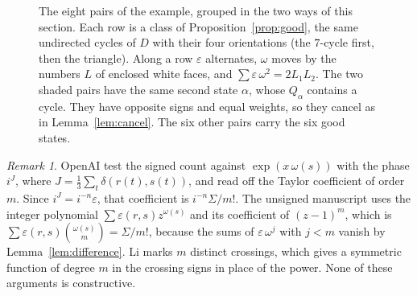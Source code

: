 \documentclass[10pt]{amsart}
\numberwithin{equation}{section}
\theoremstyle{definition}
\theoremstyle{remark}
\newtheorem{remark}[equation]{Remark}
\newcommand{\eps}{\varepsilon}
\begin{document}
\begin{figure}[!htb]
\centering
{}
\caption{The eight pairs of the example, grouped in the two ways of this section. Each row is a class of Proposition~\ref{prop:good}, the same undirected cycles of $D$ with their four orientations (the $7$-cycle first, then the triangle). Along a row $\eps$ alternates, $\omega$ moves by the numbers $L$ of enclosed white faces, and $\sum\eps\,\omega^2=2L_1L_2$. The two shaded pairs have the same second state $\alpha$, whose $Q_\alpha$ contains a cycle. They have opposite signs and equal weights, so they cancel as in Lemma~\ref{lem:cancel}. The six other pairs carry the six good states.}
\label{fig:groupings}
\end{figure}

\begin{remark}\label{rem:other-sums}
OpenAI test the signed count against $\exp(x\,\omega(s))$ with the phase $i^{J}$, where $J=\frac13\sum_t\delta(r(t),s(t))$, and read off the Taylor coefficient of order $m$.
Since $i^{J}=i^{-n}\eps$, that coefficient is $i^{-n}\Sigma/m!$.
The unsigned manuscript \cite{constructive2026} uses the integer polynomial $\sum\eps(r,s)z^{\omega(s)}$ and its coefficient of $(z-1)^m$, which is $\sum\eps(r,s)\binom{\omega(s)}{m}=\Sigma/m!$, because the sums of $\eps\,\omega^j$ with $j<m$ vanish by Lemma~\ref{lem:difference}.
Li \cite{li2026} marks $m$ distinct crossings, which gives a symmetric function of degree $m$ in the crossing signs in place of the power.
None of these arguments is constructive.
\end{remark}
\end{document}
